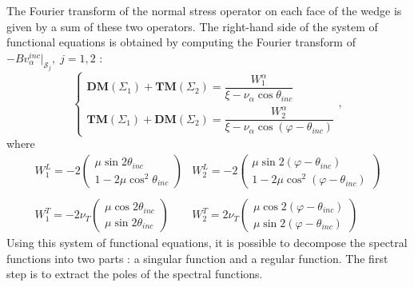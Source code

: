 The Fourier transform of the normal stress operator on each face of the wedge is given by a sum of these two operators. The right-hand side of the system of functional equations is obtained by computing the Fourier transform of $-Bv_{\alpha}^{inc}|_{\mathcal{S}_j},\; j=1,2$ :
\begin{equation}
\left\{
\begin{matrix}
\textbf{DM}(\Sigma_1)+\textbf{TM}(\Sigma_2)=\dfrac{W_1^{\alpha}}{\xi-\nu_{\alpha} \cos \theta_{inc}} \\
\textbf{TM}(\Sigma_1)+\textbf{DM}(\Sigma_2)=\dfrac{W_2^{\alpha}}{\xi-\nu_{\alpha}\cos(\varphi-\theta_{inc})}
\end{matrix}
\right.,
\label{equationsintegrales}
\end{equation}
where
\begin{equation}
\begin{matrix}
W_1^L=-2\begin{pmatrix}
\mu \sin 2\theta_{inc}\\
1-2\mu\cos^2\theta_{inc}
\end{pmatrix}&
W_2^L=-2\begin{pmatrix}
\mu \sin 2(\varphi-\theta_{inc}) \\
1-2\mu\cos^2(\varphi-\theta_{inc})
\end{pmatrix} \\
~
\\
W_1^T=-2 \nu_T \begin{pmatrix}
\mu \cos 2\theta_{inc}\\
\mu \sin 2\theta_{inc}
\end{pmatrix}&
W_2^T=2\nu_T \begin{pmatrix}
\mu \cos 2(\varphi-\theta_{inc})\\
\mu \sin 2(\varphi-\theta_{inc})
\end{pmatrix}
\end{matrix}
\end{equation}
Using this system of functional equations, it is possible to decompose the spectral functions into two parts : a singular function and a regular function. The first step is to extract the poles of the spectral functions.
